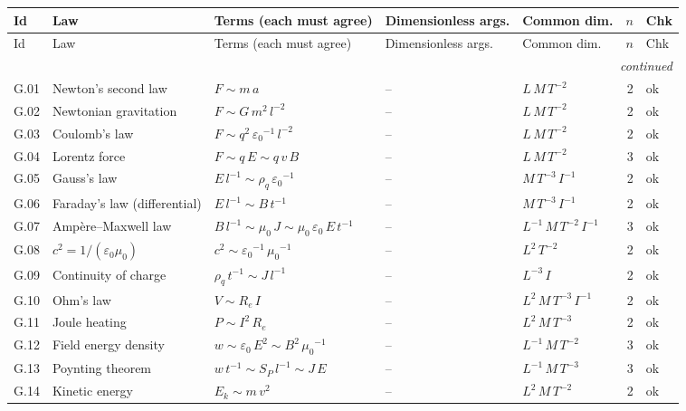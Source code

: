 {\scriptsize\setlength{\tabcolsep}{3pt}
\begin{longtable}{@{}l>{\raggedright\arraybackslash}p{3.0cm}>{\raggedright\arraybackslash}p{5.6cm}>{\raggedright\arraybackslash}p{2.0cm}>{\raggedright\arraybackslash}p{2.3cm}rl@{}}
\toprule
Id & Law & Terms (each must agree) & Dimensionless args. & Common dim. & $n$ & Chk \\
\midrule\endfirsthead
\toprule
Id & Law & Terms (each must agree) & Dimensionless args. & Common dim. & $n$ & Chk \\
\midrule\endhead
\midrule\multicolumn{7}{r}{\emph{continued}}\\\endfoot
\bottomrule\endlastfoot
G.01 & Newton's second law & $F \sim m\,a$ & -- & $L\,M\,T^{-2}$ & 2 & ok \\
G.02 & Newtonian gravitation & $F \sim G\,{m}^{2}\,{l}^{-2}$ & -- & $L\,M\,T^{-2}$ & 2 & ok \\
G.03 & Coulomb's law & $F \sim {q}^{2}\,{\varepsilon_0}^{-1}\,{l}^{-2}$ & -- & $L\,M\,T^{-2}$ & 2 & ok \\
G.04 & Lorentz force & $F \sim q\,E \sim q\,v\,B$ & -- & $L\,M\,T^{-2}$ & 3 & ok \\
G.05 & Gauss's law & $E\,{l}^{-1} \sim \rho_q\,{\varepsilon_0}^{-1}$ & -- & $M\,T^{-3}\,I^{-1}$ & 2 & ok \\
G.06 & Faraday's law (differential) & $E\,{l}^{-1} \sim B\,{t}^{-1}$ & -- & $M\,T^{-3}\,I^{-1}$ & 2 & ok \\
G.07 & Amp\`ere--Maxwell law & $B\,{l}^{-1} \sim \mu_0\,J \sim \mu_0\,\varepsilon_0\,E\,{t}^{-1}$ & -- & $L^{-1}\,M\,T^{-2}\,I^{-1}$ & 3 & ok \\
G.08 & $c^2 = 1/(\varepsilon_0\mu_0)$ & ${c}^{2} \sim {\varepsilon_0}^{-1}\,{\mu_0}^{-1}$ & -- & $L^{2}\,T^{-2}$ & 2 & ok \\
G.09 & Continuity of charge & $\rho_q\,{t}^{-1} \sim J\,{l}^{-1}$ & -- & $L^{-3}\,I$ & 2 & ok \\
G.10 & Ohm's law & $V \sim R_e\,I$ & -- & $L^{2}\,M\,T^{-3}\,I^{-1}$ & 2 & ok \\
G.11 & Joule heating & $P \sim {I}^{2}\,R_e$ & -- & $L^{2}\,M\,T^{-3}$ & 2 & ok \\
G.12 & Field energy density & $w \sim \varepsilon_0\,{E}^{2} \sim {B}^{2}\,{\mu_0}^{-1}$ & -- & $L^{-1}\,M\,T^{-2}$ & 3 & ok \\
G.13 & Poynting theorem & $w\,{t}^{-1} \sim S_P\,{l}^{-1} \sim J\,E$ & -- & $L^{-1}\,M\,T^{-3}$ & 3 & ok \\
G.14 & Kinetic energy & $E_k \sim m\,{v}^{2}$ & -- & $L^{2}\,M\,T^{-2}$ & 2 & ok \\

\end{longtable}}

